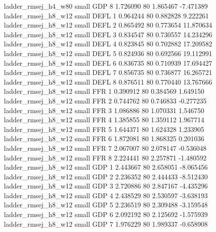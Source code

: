      ladder_rmsej_h4_w80      small      GDP                 8 1.726090 80       1.865467          -7.471389
     ladder_rmsej_h8_w12      small     DEFL                 1 0.964244 80       0.882828           9.222261
     ladder_rmsej_h8_w12      small     DEFL                 2 0.865492 80       0.773654          11.870634
     ladder_rmsej_h8_w12      small     DEFL                 3 0.834547 80       0.730557          14.234296
     ladder_rmsej_h8_w12      small     DEFL                 4 0.823845 80       0.702882          17.209582
     ladder_rmsej_h8_w12      small     DEFL                 5 0.824936 80       0.692566          19.112991
     ladder_rmsej_h8_w12      small     DEFL                 6 0.836735 80       0.710939          17.694427
     ladder_rmsej_h8_w12      small     DEFL                 7 0.856735 80       0.736877          16.265721
     ladder_rmsej_h8_w12      small     DEFL                 8 0.876511 80       0.770440          13.767666
     ladder_rmsej_h8_w12      small      FFR                 1 0.390912 80       0.384569           1.649150
     ladder_rmsej_h8_w12      small      FFR                 2 0.744762 80       0.746833          -0.277235
     ladder_rmsej_h8_w12      small      FFR                 3 1.086886 80       1.070331           1.546750
     ladder_rmsej_h8_w12      small      FFR                 4 1.385855 80       1.359112           1.967714
     ladder_rmsej_h8_w12      small      FFR                 5 1.644371 80       1.624328           1.233905
     ladder_rmsej_h8_w12      small      FFR                 6 1.872081 80       1.868325           0.201036
     ladder_rmsej_h8_w12      small      FFR                 7 2.067007 80       2.078147          -0.536048
     ladder_rmsej_h8_w12      small      FFR                 8 2.224441 80       2.257871          -1.480592
     ladder_rmsej_h8_w12      small      GDP                 1 2.443667 80       2.658051          -8.065456
     ladder_rmsej_h8_w12      small      GDP                 2 2.236352 80       2.444433          -8.512430
     ladder_rmsej_h8_w12      small      GDP                 3 2.720886 80       2.847167          -4.435296
     ladder_rmsej_h8_w12      small      GDP                 4 2.438529 80       2.530597          -3.638193
     ladder_rmsej_h8_w12      small      GDP                 5 2.236519 80       2.309488          -3.159548
     ladder_rmsej_h8_w12      small      GDP                 6 2.092192 80       2.125692          -1.575939
     ladder_rmsej_h8_w12      small      GDP                 7 1.976229 80       1.989337          -0.658908
